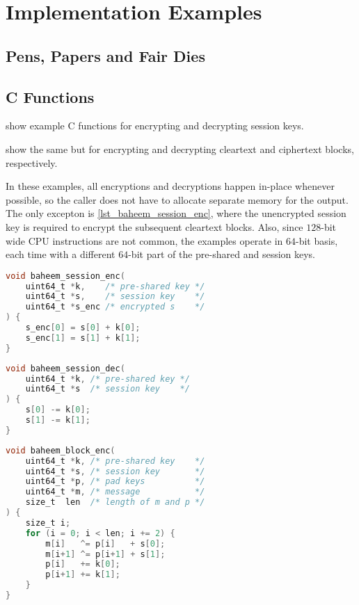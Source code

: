 \documentclass[twocolumn,hidelinks]{article}
\begin{document}



\appendix
\section{Implementation Examples}
\subsection{Pens, Papers and Fair Dies}

\subsection{C Functions}
 show example C
functions for encrypting and decrypting session keys.

 show the same but for
encrypting and decrypting cleartext and ciphertext blocks, respectively.

In these examples, all encryptions and decryptions happen in-place whenever
possible, so the caller does not have to allocate separate memory for the
output.  The only excepton is \cref{lst_baheem_session_enc}, where the
unencrypted session key is required to encrypt the subsequent cleartext
blocks. Also, since $128$-bit wide CPU instructions are not common, the
examples operate in $64$-bit basis, each time with a different $64$-bit
part of the pre-shared and session keys.

\begin{lstlisting}[language=C, caption=Session key encryption function
                   example., label=lst_baheem_session_enc]
void baheem_session_enc(
    uint64_t *k,    /* pre-shared key */
    uint64_t *s,    /* session key    */
    uint64_t *s_enc /* encrypted s    */
) {
    s_enc[0] = s[0] + k[0];
    s_enc[1] = s[1] + k[1];
}
\end{lstlisting}

\begin{lstlisting}[language=C, caption=Session key decryption function
                   example., label=lst_baheem_session_dec]
void baheem_session_dec(
    uint64_t *k, /* pre-shared key */
    uint64_t *s  /* session key    */
) {
    s[0] -= k[0];
    s[1] -= k[1];
}
\end{lstlisting}

\begin{lstlisting}[language=C, caption=Block encryption function example.,
                   label=lst_baheem_block_enc]
void baheem_block_enc(
    uint64_t *k, /* pre-shared key    */
    uint64_t *s, /* session key       */
    uint64_t *p, /* pad keys          */
    uint64_t *m, /* message           */
    size_t  len  /* length of m and p */
) {
    size_t i;
    for (i = 0; i < len; i += 2) {
        m[i]   ^= p[i]   + s[0];
        m[i+1] ^= p[i+1] + s[1];
        p[i]   += k[0];
        p[i+1] += k[1];
    }
}
\end{lstlisting}
\end{document}
